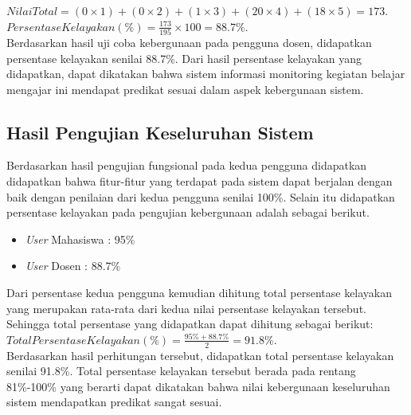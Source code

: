 \(Nilai Total = (0 \times 1) + (0 \times 2) + (1 \times 3) + (20 \times 4) + (18 \times 5) = 173\).
\indent \(Persentase Kelayakan(\%) = \frac{173}{195}\times100=88.7\%\). \\
\indent Berdasarkan hasil uji coba kebergunaan pada pengguna dosen, didapatkan persentase kelayakan senilai 88.7\%. Dari hasil persentase kelayakan yang didapatkan, dapat dikatakan bahwa sistem informasi monitoring kegiatan belajar mengajar ini mendapat predikat sesuai dalam aspek kebergunaan sistem.

\subsection{Hasil Pengujian Keseluruhan Sistem}

Berdasarkan hasil pengujian fungsional pada kedua pengguna didapatkan didapatkan bahwa fitur-fitur yang terdapat pada sistem dapat berjalan dengan baik dengan penilaian dari kedua pengguna senilai 100\%. Selain itu didapatkan persentase kelayakan pada pengujian kebergunaan adalah sebagai berikut.

\begin{itemize}
	\item \textit{User} Mahasiswa \indent : 95\%
	\item \textit{User} Dosen \indent : 88.7\%
\end{itemize}

Dari persentase kedua pengguna kemudian dihitung total persentase kelayakan yang merupakan rata-rata dari kedua nilai persentase kelayakan tersebut. Sehingga total persentase yang didapatkan dapat dihitung sebagai berikut: \\
\indent \(Total Persentase Kelayakan(\%) = \frac{95\%+88.7\%}{2}=91.8\%\). \\
Berdasarkan hasil perhitungan tersebut, didapatkan total persentase kelayakan senilai 91.8\%. Total persentase kelayakan tersebut berada pada rentang 81\%-100\% yang berarti dapat dikatakan bahwa nilai kebergunaan keseluruhan sistem mendapatkan predikat sangat sesuai.

